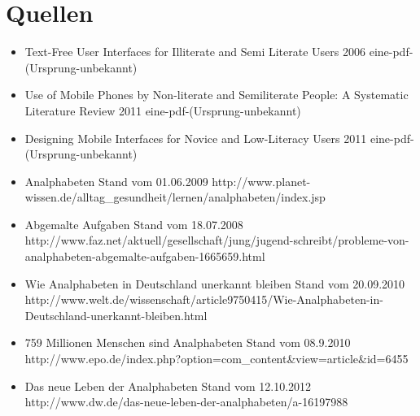 \newpage 


\thispagestyle{empty}


 \section*{Quellen}



\begin{itemize}

  \item {}
					{Text-Free User Interfaces for Illiterate and Semi Literate Users}
					{2006}
					{eine-pdf-(Ursprung-unbekannt)}
	
	\item {}
					{Use of Mobile Phones by Non-literate and Semiliterate People: A Systematic Literature Review}
					{2011}
					{eine-pdf-(Ursprung-unbekannt)}
					
	\item {}
					{Designing Mobile Interfaces for Novice and Low-Literacy Users}
					{2011}
					{eine-pdf-(Ursprung-unbekannt)}


	\item {}
						{Analphabeten}
						{Stand vom 01.06.2009}
						{http://www.planet-wissen.de/alltag_gesundheit/lernen/analphabeten/index.jsp}
										

	\item {}
						{Abgemalte Aufgaben}
						{Stand vom 18.07.2008}
						{http://www.faz.net/aktuell/gesellschaft/jung/jugend-schreibt/probleme-von-analphabeten-abgemalte-aufgaben-1665659.html}									

	\item {}
						{Wie Analphabeten in Deutschland unerkannt bleiben}
						{Stand vom 20.09.2010}
						{http://www.welt.de/wissenschaft/article9750415/Wie-Analphabeten-in-Deutschland-unerkannt-bleiben.html}	

	\item {}
						{759 Millionen Menschen sind Analphabeten}
						{Stand vom 08.9.2010}
						{http://www.epo.de/index.php?option=com_content&view=article&id=6455}										

	\item {}
						{Das neue Leben der Analphabeten }
						{Stand vom 12.10.2012}
						{http://www.dw.de/das-neue-leben-der-analphabeten/a-16197988}										


\end{itemize}
